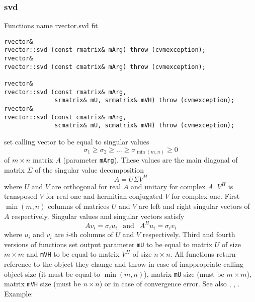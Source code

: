 \subsubsection{svd}
Functions%
\pdfdest name {rvector.svd} fit
\begin{verbatim}
rvector&
rvector::svd (const rmatrix& mArg) throw (cvmexception);
rvector&
rvector::svd (const cmatrix& mArg) throw (cvmexception);

rvector&
rvector::svd (const rmatrix& mArg,
              srmatrix& mU, srmatrix& mVH) throw (cvmexception);
rvector&
rvector::svd (const cmatrix& mArg,
              scmatrix& mU, scmatrix& mVH) throw (cvmexception);
\end{verbatim}
set calling vector to be equal to singular values
\begin{equation*}
\sigma_1\ge\sigma_2\ge\dots\ge\sigma_{\min(m,n)}\ge 0
\end{equation*}
of $m\times n$ matrix $A$ (parameter \verb"mArg").
These values are the main
diagonal of matrix $\Sigma$ of the singular value decomposition
\begin{equation*}
A=U\Sigma V^H
\end{equation*}
where
$U$ and $V$ are orthogonal
for real $A$ and unitary for complex $A$.
$V^H$ is transposed $V$ for real one and
hermitian conjugated $V$ for complex one.
First $\min(m, n)$
columns of  matrices $U$ and $V$ are
left and right singular
vectors of $A$ respectively.
Singular values and singular vectors satisfy
\begin{equation*}
Av_i=\sigma_i u_i\ \ \text{ and }\ \ A^Hu_i=\sigma_i v_i
\end{equation*}
where $u_i$ and $v_i$ are \hbox{$i$-th}
columns of $U$ and $V$ respectively.
Third and fourth versions of  functions
set output parameter \verb"mU" to be equal
to  matrix $U$ of size $m\times m$ and
\verb"mVH" to be equal
to  matrix $V^H$ of size $n\times n$.
All  functions
return  reference to the object they change and throw
in case of inappropriate calling object size
(it must be equal to $\min(m,n)$), matrix \verb'mU' size 
(must be $m\times m$), matrix \verb'mVH' size
(must be $n\times n$) or in case of convergence error.
See also
,
,
.
Example:
